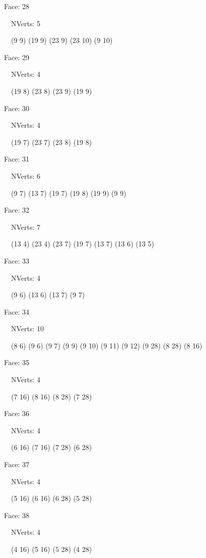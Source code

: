\documentclass{article}
\begin{document}
{\footnotesize 

Face: 28

\   \    NVerts: 5

 \   \   (9 9) (19 9) (23 9) (23 10) (9 10)}

{\footnotesize 

Face: 29

\   \    NVerts: 4

 \   \   (19 8) (23 8) (23 9) (19 9)}

{\footnotesize 

Face: 30

\   \    NVerts: 4

 \   \   (19 7) (23 7) (23 8) (19 8)}

{\footnotesize 

Face: 31

\   \    NVerts: 6

 \   \   (9 7) (13 7) (19 7) (19 8) (19 9) (9 9)}

{\footnotesize 

Face: 32

\   \    NVerts: 7

 \   \   (13 4) (23 4) (23 7) (19 7) (13 7) (13 6) (13 5)}

{\footnotesize 

Face: 33

\   \    NVerts: 4

 \   \   (9 6) (13 6) (13 7) (9 7)}

{\footnotesize 

Face: 34

\   \    NVerts: 10

 \   \   (8 6) (9 6) (9 7) (9 9) (9 10) (9 11) (9 12) (9 28) (8 28) (8 16)}

{\footnotesize 

Face: 35

\   \    NVerts: 4

 \   \   (7 16) (8 16) (8 28) (7 28)}

{\footnotesize 

Face: 36

\   \    NVerts: 4

 \   \   (6 16) (7 16) (7 28) (6 28)}

{\footnotesize 

Face: 37

\   \    NVerts: 4

 \   \   (5 16) (6 16) (6 28) (5 28)}

{\footnotesize 

Face: 38

\   \    NVerts: 4

 \   \   (4 16) (5 16) (5 28) (4 28)}
\end{document}
